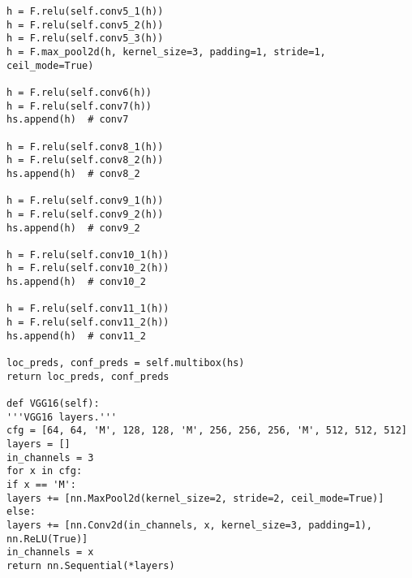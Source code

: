 \begin{lstlisting}
h = F.relu(self.conv5_1(h))
h = F.relu(self.conv5_2(h))
h = F.relu(self.conv5_3(h))
h = F.max_pool2d(h, kernel_size=3, padding=1, stride=1, ceil_mode=True)

h = F.relu(self.conv6(h))
h = F.relu(self.conv7(h))
hs.append(h)  # conv7

h = F.relu(self.conv8_1(h))
h = F.relu(self.conv8_2(h))
hs.append(h)  # conv8_2

h = F.relu(self.conv9_1(h))
h = F.relu(self.conv9_2(h))
hs.append(h)  # conv9_2

h = F.relu(self.conv10_1(h))
h = F.relu(self.conv10_2(h))
hs.append(h)  # conv10_2

h = F.relu(self.conv11_1(h))
h = F.relu(self.conv11_2(h))
hs.append(h)  # conv11_2

loc_preds, conf_preds = self.multibox(hs)
return loc_preds, conf_preds

def VGG16(self):
'''VGG16 layers.'''
cfg = [64, 64, 'M', 128, 128, 'M', 256, 256, 256, 'M', 512, 512, 512]
layers = []
in_channels = 3
for x in cfg:
if x == 'M':
layers += [nn.MaxPool2d(kernel_size=2, stride=2, ceil_mode=True)]
else:
layers += [nn.Conv2d(in_channels, x, kernel_size=3, padding=1),
nn.ReLU(True)]
in_channels = x
return nn.Sequential(*layers)
\end{lstlisting}


